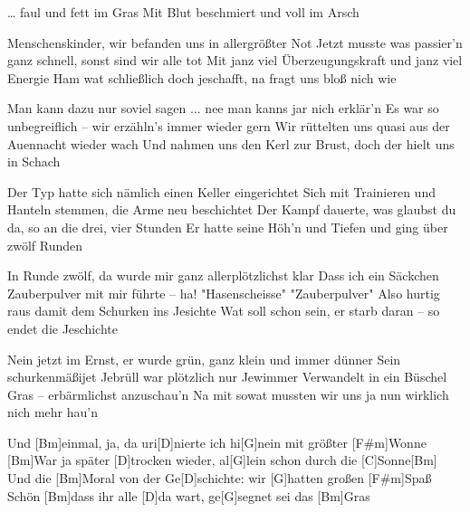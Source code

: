 \begin{guitar}
	… faul und fett im Gras
	Mit Blut beschmiert und voll im Arsch
	
	Menschenskinder, wir befanden uns in allergrößter Not
	Jetzt musste was passier'n ganz schnell, sonst sind wir alle tot
	Mit janz viel Überzeugungskraft und janz viel Energie
	Ham wat schließlich doch jeschafft, na fragt uns bloß nich wie
	
	Man kann dazu nur soviel sagen ... nee man kanns jar nich erklär'n
	Es war so unbegreiflich – wir erzähln's immer wieder gern
	Wir rüttelten uns quasi aus der Auennacht wieder wach
	Und nahmen uns den Kerl zur Brust, doch der hielt uns in Schach
	
	Der Typ hatte sich nämlich einen Keller eingerichtet
	Sich mit Trainieren und Hanteln stemmen, die Arme neu beschichtet
	Der Kampf dauerte, was glaubst du da, so an die drei, vier Stunden
	Er hatte seine Höh'n und Tiefen und ging über zwölf Runden
	
	In Runde zwölf, da wurde mir ganz allerplötzlichst klar
	Dass ich ein Säckchen Zauberpulver mit mir führte – ha!
	"Hasenscheisse" "Zauberpulver"
	Also hurtig raus damit dem Schurken ins Jesichte
	Wat soll schon sein, er starb daran – so endet die Jeschichte
	
	Nein jetzt im Ernst, er wurde grün, ganz klein und immer dünner
	Sein schurkenmäßijet Jebrüll war plötzlich nur Jewimmer
	Verwandelt in ein Büschel Gras – erbärmlichst anzuschau'n
	Na mit sowat mussten wir uns ja nun wirklich nich mehr hau'n
	
	Und [Bm]einmal, ja, da uri[D]nierte ich hi[G]nein mit größter [F#m]Wonne
	[Bm]War ja später [D]trocken wieder, al[G]lein schon durch die [C]Sonne[Bm]{}
	Und die [Bm]Moral von der Ge[D]schichte: wir [G]hatten großen [F#m]Spaß
	Schön [Bm]dass ihr alle [D]da wart, ge[G]segnet sei das [Bm]Gras
\end{guitar}